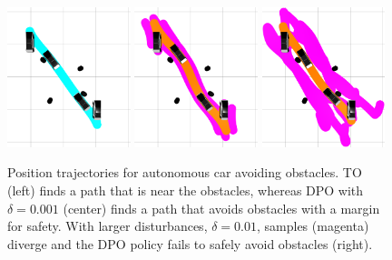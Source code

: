 \begin{figure}[H]
	\centering
	\includegraphics[width=0.32\textwidth]{dpo/car_to.png}
	\includegraphics[width=0.32\textwidth]{dpo/car_dpo_sample_1.png}
	\includegraphics[width=0.32\textwidth]{dpo/car_dpo_sample_2.png}
	\caption[Comparison of car obstacle-avoidance planning with trajectory optimization and Direct Policy Optimization]{Position trajectories for autonomous car avoiding obstacles. TO (left) finds a path that is near the obstacles, whereas DPO with $\delta = 0.001$ (center) finds a path that avoids obstacles with a margin for safety. With larger disturbances, $\delta = 0.01$, samples (magenta) diverge and the DPO policy fails to safely avoid obstacles (right).}
	\label{dpo_car_trajectory}
\end{figure}

